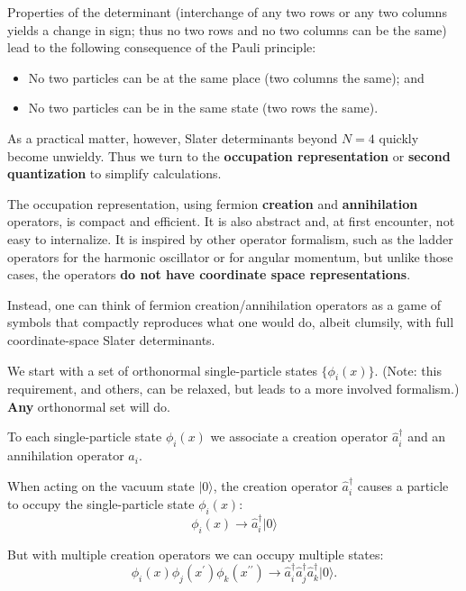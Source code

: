 Properties of the determinant (interchange of any two rows or 
any two columns yields a change in sign; thus no two rows and no 
two columns can be the same) lead to the following consequence of the Pauli principle:

\begin{itemize}
\item No two particles can be at the same place (two columns the same); and

\item No two particles can be in the same state (two rows the same).
\end{itemize}

\noindent
As a practical matter, however, Slater determinants beyond $N=4$ quickly become 
unwieldy. Thus we turn to the \textbf{occupation representation} or \textbf{second quantization} to simplify calculations. 

The occupation representation, using fermion \textbf{creation} and \textbf{annihilation} 
operators, is compact and efficient. It is also abstract and, at first encounter, not easy to 
internalize. It is inspired by other operator formalism, such as the ladder operators for 
the harmonic oscillator or for angular momentum, but unlike those cases, the operators \textbf{do not have coordinate space representations}.

Instead, one can think of fermion creation/annihilation operators as a game of symbols that 
compactly reproduces what one would do, albeit clumsily, with full coordinate-space Slater 
determinants. 



We start with a set of orthonormal single-particle states $\{ \phi_i(x) \}$. 
(Note: this requirement, and others, can be relaxed, but leads to a 
more involved formalism.) \textbf{Any} orthonormal set will do. 

To each single-particle state $\phi_i(x)$ we associate a creation operator 
$\hat{a}^\dagger_i$ and an annihilation operator $\hat{a}_i$. 

When acting on the vacuum state $| 0 \rangle$, the creation operator $\hat{a}^\dagger_i$ causes 
a particle to occupy the single-particle state $\phi_i(x)$:
\[
\phi_i(x) \rightarrow \hat{a}^\dagger_i |0 \rangle
\]



But with multiple creation operators we can occupy multiple states:
\[
\phi_i(x) \phi_j(x^\prime) \phi_k(x^{\prime \prime}) 
\rightarrow \hat{a}^\dagger_i \hat{a}^\dagger_j \hat{a}^\dagger_k |0 \rangle.
\]


